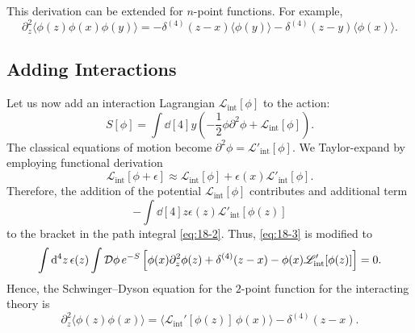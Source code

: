 
This derivation can be extended for $n$-point functions. For example, 
\begin{equation}
  \partial^2_z \langle \phi(z) \phi(x) \phi(y) \rangle = - \delta^{(4)} (z - x) \langle \phi(y) \rangle - \delta^{(4)} (z - y) \langle \phi(x) \rangle.
\end{equation}

\subsection{Adding Interactions}%
\label{sub:adding_interactions}

Let us now add an interaction Lagrangian $\mathscr{L}_{\text{int}}[\phi]$ to the action:
\begin{equation}
  S[\phi] = \int \dd[4]{y} \left( -\frac{1}{2} \phi \partial^2 \phi + \mathscr{L}_{\text{int}}[\phi] \right).
\end{equation}
The classical equations of motion become $\partial^2 \phi = \mathscr{L}'_{\text{int}}[\phi]$.
We Taylor-expand by employing functional derivation
\begin{equation}
  \mathscr{L}_{\text{int}} [\phi + \epsilon] \approx \mathscr{L}_{\text{int}} [\phi] + \epsilon(x) \mathscr{L}'_{\text{int}}[\phi].
\end{equation}
Therefore, the addition of the potential $\mathscr{L}_{\text{int}}[\phi]$ contributes and additional term
\begin{equation}
  - \int \dd[4]{z} \epsilon(z) \mathscr{L}'_{\text{int}}[\phi(z)]
\end{equation}
to the bracket in the path integral \eqref{eq:18-2}.
Thus, \eqref{eq:18-3} is modified to 
\begin{equation}
  \int \dd[4]{z} \epsilon(z) \int \mathop{\mathcal{D} \phi} e^{-S} \left[ \phi(x) \partial^2_z \phi(z) + \delta^{(4)}(z - x) - \phi(x) \mathscr{L}'_{\text{int}}[\phi(z)] \right] = 0.
\end{equation}
Hence, the Schwinger--Dyson equation for the $2$-point function for the interacting theory is
\begin{equation}
  \label{eq:scalar-sd}
  \partial^2_z \langle \phi(z) \phi(x) \rangle = \langle \mathscr{L}_{\text{int}}'[\phi(z)] \, \phi(x) \rangle - \delta^{(4)} (z - x).
\end{equation}


